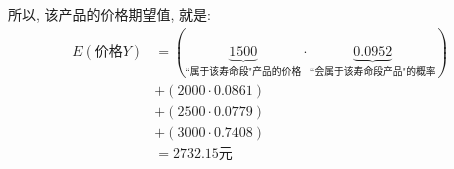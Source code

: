 \documentclass[UTF8]{ctexart}
\begin{document}
\begin{myEnvSample}
所以, 该产品的价格期望值, 就是: \\
\begin{align*}  %
	E(\text{价格}Y) & =\left( \underset{\text{``属于该寿命段"产品的价格}}{\underbrace{1500}}\cdot \underset{\text{``会属于该寿命段产品"的概率}}{\underbrace{0.0952}} \right)\\
& +\left( 2000\cdot 0.0861 \right)\\
& +\left( 2500\cdot 0.0779 \right)\\
& +\left( 3000\cdot 0.7408 \right)\\
& =2732.15 \text{元}
\end{align*}
\end{myEnvSample}
	
	
	
\end{document}
